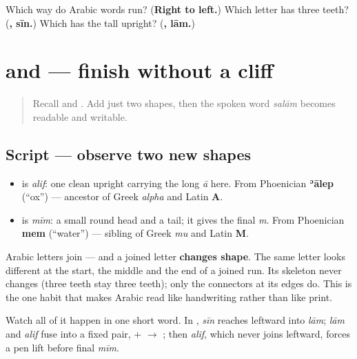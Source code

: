 \begin{tcolorbox}[breakable,colback=teal!4,colframe=teal!35!black,title={Before you move on}]
Which way do Arabic words run? (\textbf{Right to left.}) Which letter has three teeth? (\textbf{, sīn.}) Which has the tall upright? (\textbf{, lām.})
\end{tcolorbox}
\section[\texorpdfstring{\ar{ا} \ar{م} — \ar{سلام} (alif, mīm — salām)}{ا م — سلام (alif, mīm — salām)}]{ and  — finish \textbf{} without a cliff}

\label{lesson:AR-W00-alif-mim-salam}



\begin{quote}
Recall \textbf{} and \textbf{}. Add just two shapes, then the spoken word \emph{salām} becomes readable and writable.
\end{quote}

\subsection*{Script — observe two new shapes}
\begin{itemize}
\raggedright
  \item \textbf{} is \emph{alif}: one clean upright carrying the long \emph{ā} here. From Phoenician \textbf{ʾālep} (\textquotedblleft{}ox\textquotedblright{}) — ancestor of Greek \emph{alpha} and Latin \textbf{A}.
  \item \textbf{} is \emph{mīm}: a small round head and a tail; it gives the final \emph{m}. From Phoenician \textbf{mem} (\textquotedblleft{}water\textquotedblright{}) — sibling of Greek \emph{mu} and Latin \textbf{M}.
\end{itemize}

Arabic letters join — and a joined letter \textbf{changes shape}. The same letter looks different at the start, the middle and the end of a joined run. Its skeleton never changes (three teeth stay three teeth); only the connectors at its edges do. This is the one habit that makes Arabic read like handwriting rather than like print.

Watch all of it happen in one short word. In \textbf{}, \emph{sīn} reaches leftward into \emph{lām}; \emph{lām} and \emph{alif} fuse into a fixed pair, \textbf{} + \textbf{} $\to$ \textbf{}; then \emph{alif}, which never joins leftward, forces a pen lift before final \emph{mīm}.

